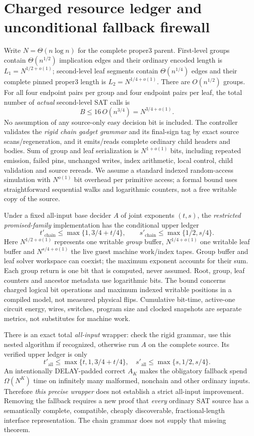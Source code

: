 \documentclass[11pt]{article}
\begin{document}
\section{Charged resource ledger and unconditional fallback firewall}
Write $N=\Theta(n\log n)$ for the complete proper3 parent. First-level groups contain $\Theta(n^{1/2})$ implication edges and their ordinary encoded length is $L_1=N^{1/2+o(1)}$; second-level leaf segments contain $\Theta(n^{1/4})$ edges and their complete pinned proper3 length is $L_2=N^{1/4+o(1)}$. There are $O(n^{1/2})$ groups. For all four endpoint pairs per group and four endpoint pairs per leaf, the total number of \emph{actual} second-level SAT calls is
\[
B\le 16\,O(n^{3/4})=N^{3/4+o(1)}.
\]
No assumption of any source-only easy decision bit is included. The controller validates the \emph{rigid chain gadget grammar} and its final-sign tag by exact source scans/regeneration, and it emits/reads complete ordinary child headers and bodies. Sum of group and leaf serialization is $N^{1+o(1)}$ bits, including repeated emission, failed pins, unchanged writes, index arithmetic, local control, child validation and source rereads. We assume a standard indexed random-access simulation with $N^{o(1)}$ bit overhead per primitive access; a formal bound uses straightforward sequential walks and logarithmic counters, not a free writable copy of the source.

Under a fixed all-input base decider $A$ of joint exponents $(t,s)$, the \emph{restricted promised-family} implementation has the conditional upper ledger
\[
t'_{\mathrm{chain}}\le\max\{1,3/4+t/4\},\qquad
s'_{\mathrm{chain}}\le\max\{1/2,s/4\}.
\]
Here $N^{1/2+o(1)}$ represents one writable \emph{group} buffer, $N^{1/4+o(1)}$ one writable leaf buffer and $N^{s/4+o(1)}$ the live guest machine work/index tapes. Group buffer and leaf solver workspace can coexist; the maximum exponent accounts for their sum. Each group return is one bit that is computed, never assumed. Root, group, leaf counters and ancestor metadata use logarithmic bits. The bound concerns charged logical bit operations and maximum indexed writable positions in a compiled model, not measured physical flips. Cumulative bit-time, active-one circuit energy, wires, switches, program size and clocked snapshots are separate metrics, not substitutes for machine work.

There is an exact total \emph{all-input} wrapper: check the rigid grammar, use this nested algorithm if recognized, otherwise run $A$ on the complete source. Its verified upper ledger is only
\[
t'_{\mathrm{all}}\le\max\{t,1,3/4+t/4\},\quad
s'_{\mathrm{all}}\le\max\{s,1/2,s/4\}.
\]
An intentionally DELAY-padded correct $A_K$ makes the obligatory fallback spend $\Omega(N^K)$ time on infinitely many malformed, nonchain and other ordinary inputs. Therefore \emph{this precise wrapper} does not establish a strict all-input improvement. Removing the fallback requires a new proof that \emph{every} ordinary SAT source has a semantically complete, compatible, cheaply discoverable, fractional-length interface representation. The chain grammar does not supply that missing theorem.
\end{document}
